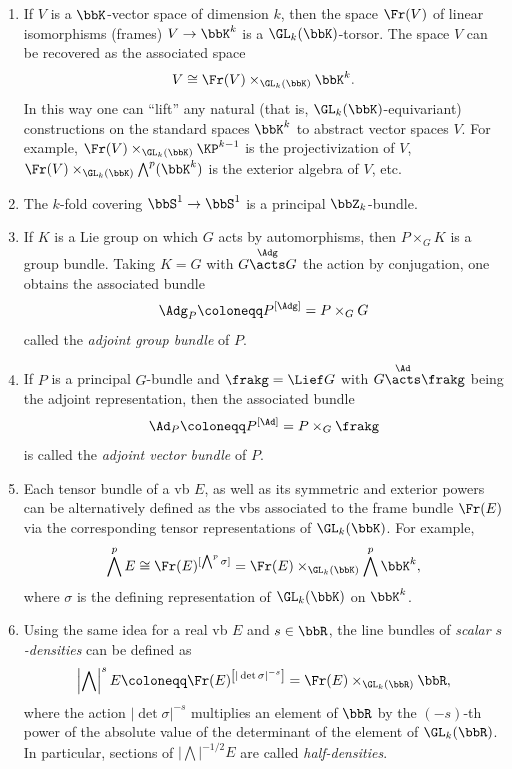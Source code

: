 \begin{example}\label{ex associated bundles}
    \begin{enumerate}
        \item If $V$ is a $\bbK$-vector space of dimension $k$, then the space $\Fr(V)$ of linear isomorphisms (frames) $V\to \bbK^k$ is a $\GL_k(\bbK)$-torsor. The space $V$ can be recovered as the associated space
        \[V\cong \Fr(V)\times_{\GL_k(\bbK)} \bbK^k.\]
        In this way one can ``lift'' any natural (that is, $\GL_k(\bbK)$-equivariant) constructions on the standard spaces $\bbK^k$ to abstract vector spaces $V$. For example, $\Fr(V)\times_{\GL_k(\bbK)} \KP^{k-1}$ is the projectivization of $V$, $\Fr(V)\times_{\GL_k(\bbK)}\bigwedge^p(\bbK^k)$ is the exterior algebra of $V$, etc.
        
        \item The $k$-fold covering $\bbS^1\to \bbS^1$ is a principal $\bbZ_k$-bundle.
        
        \item If $K$ is a Lie group on which $G$ acts by automorphisms, then $P\times_G K$ is a group bundle. Taking $K=G$ with $G\overset{\Adg}{\acts}G$ the action by conjugation, one obtains the associated bundle \[\Adg_P\coloneqq P^{[\Adg]}=P\times_G G\]
        called the \emph{adjoint group bundle} of $P$.

        \item If $P$ is a principal $G$-bundle and $\frakg=\Lief G$ with $G\overset{\Ad}{\acts}\frakg$ being the adjoint representation, then the associated bundle \[\Ad_P\coloneqq P^{[\Ad]}=P\times_G \frakg\] is called the \emph{adjoint vector bundle} of $P$.
       
        \item Each tensor bundle of a \gls{vb} $E$, as well as its symmetric and exterior powers can be alternatively defined as the \glspl{vb} associated to the frame bundle $\Fr(E)$ via the corresponding tensor representations of $\GL_k(\bbK)$. For example, \[\bigwedge^p E\cong \Fr(E)^{[\bigwedge^p \sigma]}=\Fr(E)\times_{\GL_k(\bbK)} \bigwedge^p \bbK^k,\]
        where $\sigma$ is the defining representation of $\GL_k(\bbK)$ on $\bbK^k$. 
        
        \item Using the same idea for a real \gls{vb} $E$ and $s\in\bbR$, the line bundles of \emph{scalar $s$-densities} can be defined as
        \[\left|\bigwedge\right|^s E\coloneqq \Fr(E)^{\left[|\det \sigma|^{-s}\right]}=\Fr(E)\times_{\GL_k(\bbR)}\bbR,\]
        where the action $|\det \sigma|^{-s}$ multiplies an element of $\bbR$ by the $(-s)$-th power of the absolute value of the determinant of the element of $\GL_k(\bbR)$. In particular, sections of $\left|\bigwedge\right|^{-1/2}E$ are called \emph{half-densities}.
        

\end{enumerate}
\end{example}

